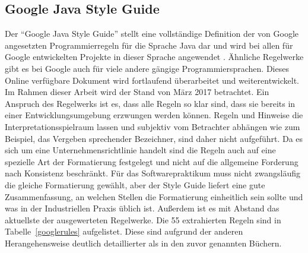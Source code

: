 \documentclass[da,ngerman]{stthesis}
\begin{document}
			\subsection{Google Java Style Guide}
				Der "`Google Java Style Guide"' stellt eine vollständige Definition der von Google angesetzten Programmierregeln für die Sprache Java dar und wird bei allen für Google entwickelten Projekte in dieser Sprache angewendet  \cite{GoogleStyleGuide}. Ähnliche Regelwerke gibt es bei Google auch für viele andere gängige Programmiersprachen. Dieses Online verfügbare Dokument wird fortlaufend überarbeitet und weiterentwickelt. Im Rahmen dieser Arbeit wird der Stand von März 2017 betrachtet. Ein Anspruch des Regelwerks ist es, dass alle Regeln so klar sind, dass sie bereits in einer Entwicklungsumgebung erzwungen werden können. Regeln und Hinweise die Interpretationsspielraum lassen und subjektiv vom Betrachter abhängen wie zum Beispiel, das Vergeben sprechender Bezeichner, sind daher nicht aufgeführt. \newline
				Da es sich um eine Unternehmensrichtlinie handelt sind die Regeln auch auf eine spezielle Art der Formatierung festgelegt und nicht auf die allgemeine Forderung nach Konsistenz beschränkt. Für das Softwarepraktikum muss nicht zwangsläufig die gleiche Formatierung gewählt, aber der Style Guide liefert eine gute Zusammenfassung, an welchen Stellen die Formatierung einheitlich sein sollte und was in der Industriellen Praxis üblich ist. Außerdem ist es mit Abstand das aktuellste der ausgewerteten Regelwerke. Die 55 extrahierten Regeln sind in Tabelle~\ref{googlerules} aufgelistet. Diese sind aufgrund der anderen Herangehensweise deutlich detaillierter als in den zuvor genannten Büchern.
\end{document}
